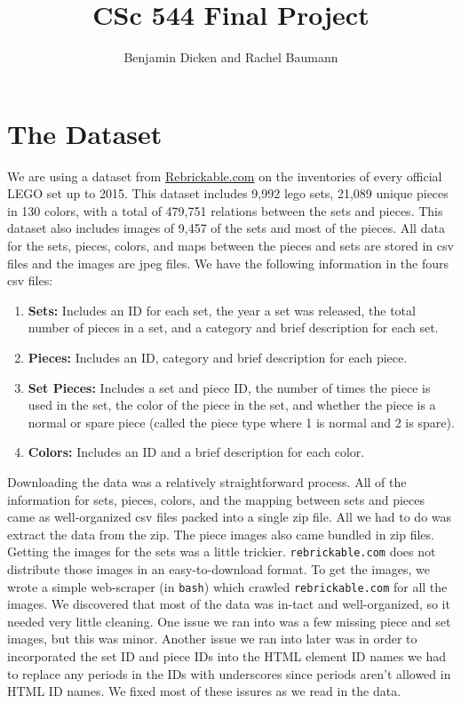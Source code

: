 \documentclass[a4paper, 11pt]{article}
\title{CSc 544 Final Project}
\author{Benjamin Dicken and Rachel Baumann}
\begin{document}
\maketitle

\section*{The Dataset}

%
%

We are using a dataset from \href{http://rebrickable.com/}{Rebrickable.com} on the inventories of every official LEGO set up to 2015. This dataset includes 9,992 lego sets, 21,089 unique pieces in 130 colors, with a total of 479,751 relations between the sets and pieces. This dataset also includes images of 9,457 of the sets and most of the pieces. All data for the sets, pieces, colors, and maps between the pieces and sets are stored in csv files and the images are jpeg files. We have the following information in the fours csv files:

\begin{enumerate}

\item {\bf Sets:} Includes an ID for each set, the year a set was released, the total number of pieces in a set, and a category and brief description for each set.

\item {\bf Pieces:} Includes an ID, category and brief description for each piece.

\item {\bf Set Pieces:} Includes a set and piece ID, the number of times the piece is used in the set, the color of the piece in the set, and whether the piece is a normal or spare piece (called the piece type where 1 is normal and 2 is spare).


\item {\bf Colors:} Includes an ID and a brief description for each color.

\end{enumerate}

Downloading the data was a relatively straightforward process. All of the information for sets, pieces, colors, and the mapping between sets and pieces came as well-organized csv files packed into a single zip file. All we had to do was extract the data from the zip. The piece images also came bundled in zip files. Getting the images for the sets was a little trickier. \texttt{rebrickable.com} does not distribute those images in an easy-to-download format. To get the images, we wrote a simple web-scraper (in \texttt{bash}) which crawled \texttt{rebrickable.com} for all the images. We discovered that most of the data was in-tact and well-organized, so it needed very little cleaning. One issue we ran into was a few missing piece and set images, but this was minor. Another issue we ran into later was in order to incorporated the set ID and piece IDs into the HTML element ID names we had to replace any periods in the IDs with underscores since periods aren't allowed in HTML ID names. We fixed most of these issures as we read in the data.
\end{document}
